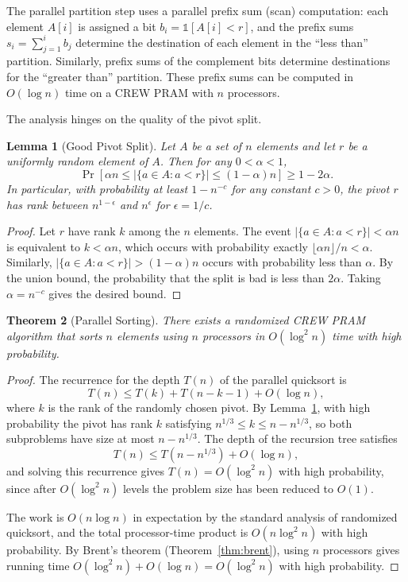 \documentclass[twoside,12pt]{book}
\theoremstyle{plain}
\newtheorem{theorem}{Theorem}[chapter]
\newtheorem{lemma}[theorem]{Lemma}
\theoremstyle{definition}
\theoremstyle{remark}
\begin{document}
The parallel partition step uses a parallel prefix sum (scan) computation: each element $A[i]$ is assigned a bit $b_i = \mathbb{1}[A[i] < r]$, and the prefix sums $s_i = \sum_{j=1}^{i} b_j$ determine the destination of each element in the ``less than'' partition. Similarly, prefix sums of the complement bits determine destinations for the ``greater than'' partition. These prefix sums can be computed in $O(\log n)$ time on a CREW PRAM with $n$ processors.

The analysis hinges on the quality of the pivot split.

\begin{lemma}[Good Pivot Split]
\label{lem:good-pivot}
Let $A$ be a set of $n$ elements and let $r$ be a uniformly random element of $A$. Then for any $0 < \alpha < 1$,
\[
\Pr\left[\alpha n \leq |\{a \in A : a < r\}| \leq (1-\alpha)n\right] \geq 1 - 2\alpha.
\]
In particular, with probability at least $1 - n^{-c}$ for any constant $c > 0$, the pivot $r$ has rank between $n^{1-\epsilon}$ and $n^{\epsilon}$ for $\epsilon = 1/c$.
\end{lemma}

\begin{proof}
Let $r$ have rank $k$ among the $n$ elements. The event $|\{a \in A : a < r\}| < \alpha n$ is equivalent to $k < \alpha n$, which occurs with probability exactly $\lfloor \alpha n \rfloor / n < \alpha$. Similarly, $|\{a \in A : a < r\}| > (1-\alpha)n$ occurs with probability less than $\alpha$. By the union bound, the probability that the split is bad is less than $2\alpha$. Taking $\alpha = n^{-c}$ gives the desired bound.
\end{proof}

\begin{theorem}[Parallel Sorting]
\label{thm:parallel-sort}
There exists a randomized CREW PRAM algorithm that sorts $n$ elements using $n$ processors in $O(\log^2 n)$ time with high probability.
\end{theorem}

\begin{proof}
The recurrence for the depth $T(n)$ of the parallel quicksort is
\[
T(n) \leq T(k) + T(n - k - 1) + O(\log n),
\]
where $k$ is the rank of the randomly chosen pivot. By Lemma~\ref{lem:good-pivot}, with high probability the pivot has rank $k$ satisfying $n^{1/3} \leq k \leq n - n^{1/3}$, so both subproblems have size at most $n - n^{1/3}$. The depth of the recursion tree satisfies
\[
T(n) \leq T(n - n^{1/3}) + O(\log n),
\]
and solving this recurrence gives $T(n) = O(\log^2 n)$ with high probability, since after $O(\log^2 n)$ levels the problem size has been reduced to $O(1)$.

The work is $O(n \log n)$ in expectation by the standard analysis of randomized quicksort, and the total processor-time product is $O(n \log^2 n)$ with high probability. By Brent's theorem (Theorem~\ref{thm:brent}), using $n$ processors gives running time $O(\log^2 n) + O(\log n) = O(\log^2 n)$ with high probability.
\end{proof}
\end{document}
